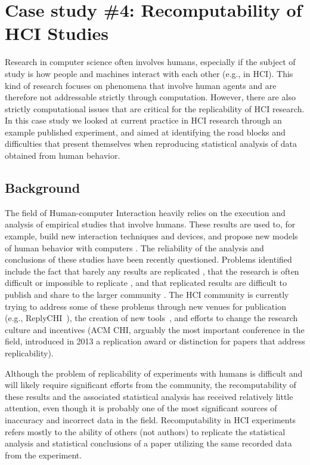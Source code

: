 \section{Case study \#4: Recomputability of HCI Studies}
\label{s:group4}

Research in computer science often involves humans, especially if the subject of study is how people and machines interact with each other (e.g., in HCI). This kind of research focuses on phenomena that involve human agents and are therefore not addressable strictly through computation. However, there are also strictly computational issues that are critical for the replicability of HCI research. In this case study we looked at current practice in HCI research through an example published experiment, and aimed at identifying the road blocks and difficulties that present themselves when reproducing statistical analysis of data obtained from human behavior.  

\subsection{Background}
The field of Human-computer Interaction heavily relies on the execution and analysis of empirical studies that involve humans. These results are used to, for example, build new interaction techniques and devices\cite{Nacenta:2008}, and propose new models of human behavior with computers \cite{Shoemaker:2012}. The reliability of the analysis and conclusions of these studies have been recently questioned. Problems identified include the fact that barely any results are replicated \cite{hornbaek:replications}, that the research is often difficult or impossible to replicate \cite{wilson:2011}, and that replicated results are difficult to publish and share to the larger community \cite{wilson:2012}. The HCI community is currently trying to address some of these problems through new venues for publication (e.g., ReplyCHI~\cite{wilson:2013,wilson:2014}), the creation of new tools~\cite{Mackay:2007}, and efforts to change the research culture and incentives (ACM CHI, arguably the most important conference in the field, introduced in 2013 a replication award or distinction for papers that address replicability).

Although the problem of replicability of experiments with humans is difficult and will likely require significant efforts from the community, the recomputability of these results and the associated statistical analysis has received relatively little attention, even though it is probably one of the most significant sources of inaccuracy and incorrect data in the field. Recomputability in HCI experiments refers mostly to the ability of others (not authors) to replicate the statistical analysis and statistical conclusions of a paper utilizing the same recorded data from the experiment. 

